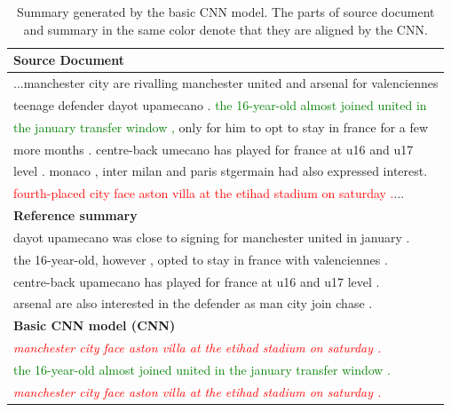 \begin{table}[th!]
\centering
\caption{Summary generated by the basic CNN model. 
	The parts of source document and summary in the same color denote that they are aligned by the CNN.
}
\begin{tabular}{l}
\toprule[1pt] \bf Source Document \\
\hline ...manchester city are rivalling manchester united and arsenal for valenciennes \\
       teenage defender dayot upamecano . \textcolor{green}{the 16-year-old almost joined united in} \\
	   \textcolor{green}{the january transfer window ,} only for him to opt to stay in france for a few \\
	   more months . centre-back umecano has played for france at u16 and u17 \\
	   level . monaco , inter milan and paris stgermain had also expressed interest. \\
	   \textcolor{red}{fourth-placed city face aston villa at the etihad stadium on saturday .}...\\
\cmidrule[1pt]{1-1} \bf Reference summary \\
\hline dayot upamecano was close to signing for manchester united in january . \\
       the 16-year-old, however , opted to stay in france with valenciennes . \\
	   centre-back upamecano has played for france at u16 and u17 level . \\
	   arsenal are also interested in the defender as man city join chase . \\
\cmidrule[1pt]{1-1} \bf Basic CNN model (CNN) \\
\hline \textcolor{red}{\textit{manchester city face aston villa at the etihad stadium on saturday .}}\\
       \textcolor{green}{the 16-year-old almost joined united in the january transfer window .}\\
	   \textcolor{red}{\textit{manchester city face aston villa at the etihad stadium on saturday .}}\\
\bottomrule[1pt]
\end{tabular}
\label{tab:example}
\end{table}


